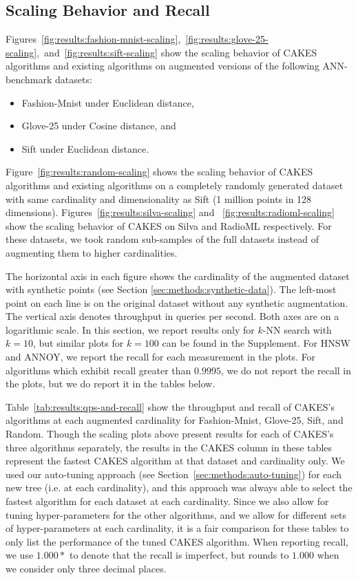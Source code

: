 \subsection{Scaling Behavior and Recall}
\label{sec:results:scaling-behavior-and-recall}

Figures~\ref{fig:results:fashion-mnist-scaling},~\ref{fig:results:glove-25-scaling},~and~\ref{fig:results:sift-scaling} show the scaling behavior of CAKES algorithms and existing algorithms on augmented versions of the following ANN-benchmark datasets:

\begin{itemize}
    \item Fashion-Mnist under Euclidean distance,
    \item Glove-25 under Cosine distance, and
    \item Sift under Euclidean distance.
\end{itemize}

Figure~\ref{fig:results:random-scaling} shows the scaling behavior of CAKES algorithms and existing algorithms on a completely randomly generated dataset with same cardinality and dimensionality as Sift (1 million points in 128 dimensions).
Figures~\ref{fig:results:silva-scaling} and ~\ref{fig:results:radioml-scaling} show the scaling behavior of CAKES on Silva and RadioML respectively.
For these datasets, we took random sub-samples of the full datasets instead of augmenting them to higher cardinalities.

The horizontal axis in each figure shows the cardinality of the augmented dataset with synthetic points (see Section \ref{sec:methods:synthetic-data}).
The left-most point on each line is on the original dataset without any synthetic augmentation.
The vertical axis denotes throughput in queries per second.
Both axes are on a logarithmic scale.
In this section, we report results only for $k$-NN search with $k = 10$, but similar plots for $k = 100$ can be found in the Supplement.
For HNSW and ANNOY, we report the recall for each measurement in the plots. For algorithms which exhibit recall greater than $0.9995$, we do not report the recall in the plots, but we do report it in the tables below.

Table~\ref{tab:results:qps-and-recall} show the throughput and recall of CAKES's algorithms at each augmented cardinality for Fashion-Mnist, Glove-25, Sift, and Random.
Though the scaling plots above present results for each of CAKES's three algorithms separately, the results in the CAKES column in these tables represent the fastest CAKES algorithm at that dataset and cardinality only.
We used our auto-tuning approach (see Section~\ref{sec:methods:auto-tuning}) for each new tree (i.e. at each cardinality), and this approach was always able to select the fastest algorithm for each dataset at each cardinality.
Since we also allow for tuning hyper-parameters for the other algorithms, and we allow for different sets of hyper-parameters at each cardinality, it is a fair comparison for these tables to only list the performance of the tuned CAKES algorithm.
When reporting recall, we use $1.000*$ to denote that the recall is imperfect, but rounds to $1.000$ when we consider only three decimal places.

